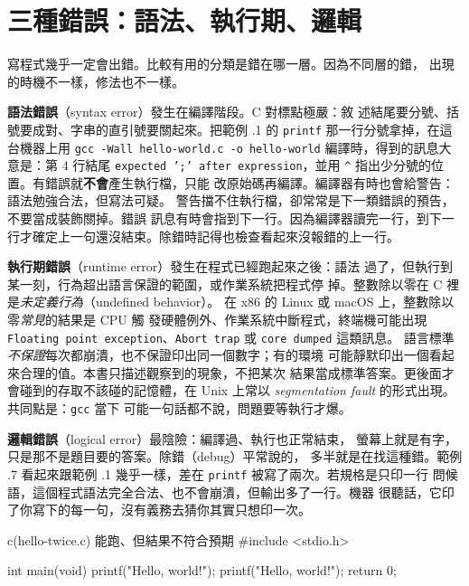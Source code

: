 \section{三種錯誤：語法、執行期、邏輯}
\label{sec:intro-error-types}

寫程式幾乎一定會出錯。比較有用的分類是錯在哪一層。因為不同層的錯，
出現的時機不一樣，修法也不一樣。

\textbf{語法錯誤}（syntax error）發生在編譯階段。C 對標點極嚴：敘
述結尾要分號、括號要成對、字串的直引號要關起來。把範例
\thechapter.1 的 \texttt{printf} 那一行分號拿掉，在這台機器上用
\texttt{gcc -Wall hello-world.c -o hello-world} 編譯時，得到的訊息大
意是：第 $4$ 行結尾 \texttt{expected ';' after expression}，並用
\texttt{\^{}} 指出少分號的位置。有錯誤就\textbf{不會}產生執行檔，只能
改原始碼再編譯。編譯器有時也會給警告：語法勉強合法，但寫法可疑。
警告擋不住執行檔，卻常常是下一類錯誤的預告，不要當成裝飾關掉。錯誤
訊息有時會指到下一行。因為編譯器讀完一行，到下一
行才確定上一句還沒結束。除錯時記得也檢查看起來沒報錯的上一行。

\textbf{執行期錯誤}（runtime error）發生在程式已經跑起來之後：語法
過了，但執行到某一刻，行為超出語言保證的範圍，或作業系統把程式停
掉。整數除以零在 C 裡是\emph{未定義行為}（undefined behavior）。
在 x86 的 Linux 或 macOS 上，整數除以零\emph{常見}的結果是 CPU 觸
發硬體例外、作業系統中斷程式，終端機可能出現 \texttt{Floating point
exception}、\texttt{Abort trap} 或 \texttt{core dumped} 這類訊息。
語言標準\emph{不保證}每次都崩潰，也不保證印出同一個數字；有的環境
可能靜默印出一個看起來合理的值。本書只描述觀察到的現象，不把某次
結果當成標準答案。更後面才會碰到的存取不該碰的記憶體，在 Unix 上常以
\emph{segmentation fault} 的形式出現。共同點是：\texttt{gcc} 當下
可能一句話都不說，問題要等執行才爆。

\textbf{邏輯錯誤}（logical error）最陰險：編譯過、執行也正常結束，
螢幕上就是有字，只是那不是題目要的答案。除錯（debug）平常說的，
多半就是在找這種錯。範例 \thechapter.7 看起來跟範例 \thechapter.1
幾乎一樣，差在 \texttt{printf} 被寫了兩次。若規格是只印一行
問候語，這個程式語法完全合法、也不會崩潰，但輸出多了一行。機器
很聽話，它印了你寫下的每一句，沒有義務去猜你其實只想印一次。

\begin{example}{c}{(hello-twice.c) 能跑、但結果不符合預期}
#include <stdio.h>

int main(void) {
    printf("Hello, world!\n");
    printf("Hello, world!\n");
    return 0;
}
\end{example}


